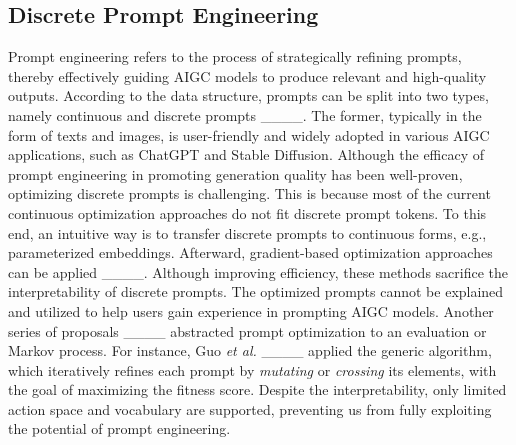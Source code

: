 \subsection{Discrete Prompt Engineering}
Prompt engineering refers to the process of strategically refining prompts, thereby effectively guiding AIGC models to produce relevant and high-quality outputs.
According to the data structure, prompts can be split into two types, namely continuous and discrete prompts ____.
The former, typically in the form of texts and images, is user-friendly and widely adopted in various AIGC applications, such as ChatGPT and Stable Diffusion.
Although the efficacy of prompt engineering in promoting generation quality has been well-proven, optimizing discrete prompts is challenging.
This is because most of the current continuous optimization approaches do not fit discrete prompt tokens.
To this end, an intuitive way is to transfer discrete prompts to continuous forms, e.g., parameterized embeddings.
Afterward, gradient-based optimization approaches can be applied ____.
Although improving efficiency, these methods sacrifice the interpretability of discrete prompts.
The optimized prompts cannot be explained and utilized to help users gain experience in prompting AIGC models.
Another series of proposals ____ abstracted prompt optimization to an evaluation or Markov process.
For instance, Guo \textit{et al.} ____ applied the generic algorithm, which iteratively refines each prompt by \textit{mutating} or \textit{crossing} its elements, with the goal of maximizing the fitness score.
Despite the interpretability, only limited action space and vocabulary are supported, preventing us from fully exploiting the potential of prompt engineering.

